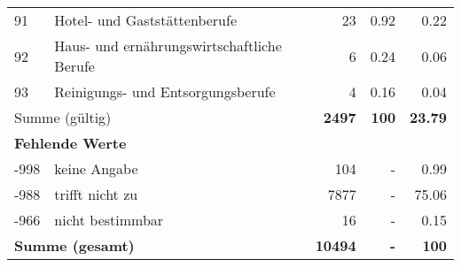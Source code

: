 \begin{longtable}{lXrrr}
        91 & \multicolumn{1}{X}{Hotel- und Gaststättenberufe} & %
          \num{23} &
          \num[round-mode=places,round-precision=2]{0.92} &
          \num[round-mode=places,round-precision=2]{0.22} \\

        92 & \multicolumn{1}{X}{Haus- und ernährungswirtschaftliche Berufe} & %
          \num{6} &
          \num[round-mode=places,round-precision=2]{0.24} &
          \num[round-mode=places,round-precision=2]{0.06} \\

        93 & \multicolumn{1}{X}{Reinigungs- und Entsorgungsberufe} & %
          \num{4} &
          \num[round-mode=places,round-precision=2]{0.16} &
          \num[round-mode=places,round-precision=2]{0.04} \\

     \midrule
     \multicolumn{2}{l}{Summe (gültig)} &
       \textbf{\num{2497}} &
     \textbf{\num{100}} &
       \textbf{\num[round-mode=places,round-precision=2]{23.79}} \\
     \multicolumn{5}{l}{\textbf{Fehlende Werte}}\\
       -998 &
       keine Angabe &
         \num{104} &
        - &
         \num[round-mode=places,round-precision=2]{0.99} \\
       -988 &
       trifft nicht zu &
         \num{7877} &
        - &
         \num[round-mode=places,round-precision=2]{75.06} \\
       -966 &
       nicht bestimmbar &
         \num{16} &
        - &
         \num[round-mode=places,round-precision=2]{0.15} \\
     \midrule
     \multicolumn{2}{l}{\textbf{Summe (gesamt)}} &
          \textbf{\num{10494}} &
        \textbf{-} &
        \textbf{\num{100}} \\
     \bottomrule
     \end{longtable}
     
